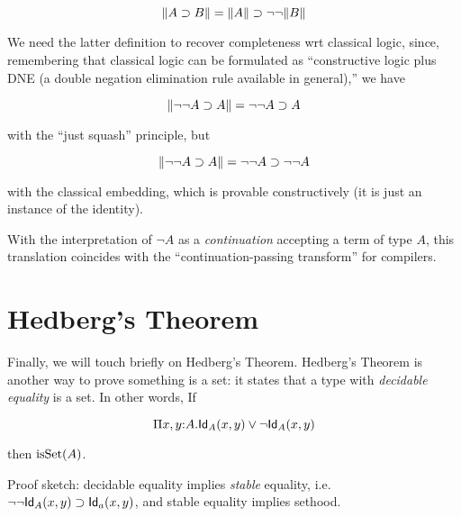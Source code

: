 \documentclass[11pt]{article}
\begin{document}
\[
{\parallel}{A\supset B}{\parallel} = {\parallel}{A}{\parallel} \supset \lnot\lnot{\parallel}{B}{\parallel}
\]

We need the latter definition to recover completeness wrt classical logic,
since, remembering that classical logic can be formulated as ``constructive
logic plus DNE (a double negation elimination rule available in general),''
we have

\[
{\parallel}{\lnot\lnot A\supset A}{\parallel} = \lnot\lnot A\supset A
\]

with the ``just squash'' principle, but

\[
{\parallel}{\lnot\lnot A\supset A}{\parallel} = \lnot\lnot A\supset \lnot\lnot A
\]

with the classical embedding, which is provable constructively (it is just
an instance of the identity).

With the interpretation of $\lnot A$ as a {\em continuation} accepting a
term of type $A$, this translation coincides with the
``continuation-passing transform'' for compilers.


\section{Hedberg's Theorem}

Finally, we will touch briefly on Hedberg's Theorem.
Hedberg's Theorem is another way to prove something is a set: it states
that a type with {\em decidable equality} is a set. In other words, If

\[
\Pi{x,y}{:}A.\mathsf{Id}_{A}(x,y) \lor \lnot\mathsf{Id}_{A}(x,y)
\]

then $\operatorname{isSet}(A)$.

Proof sketch: decidable equality implies {\em stable} equality, i.e.
$\lnot\lnot\mathsf{Id}_{A}(x,y) \supset \mathsf{Id}_{a}(x,y)$, and stable equality implies
sethood.
\end{document}
